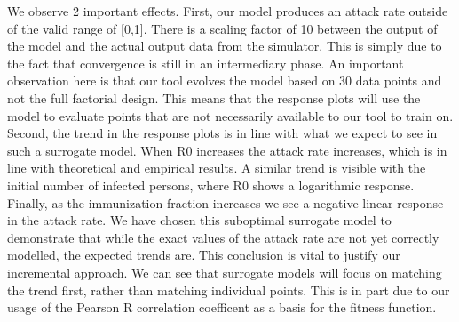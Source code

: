 We observe 2 important effects. First, our model produces an attack rate outside of the valid range of [0,1]. There is a scaling factor of 10 between the output of the model and the actual output data from the simulator. This is simply due to the fact that convergence is still in an intermediary phase. An important observation here is that our tool evolves the model based on 30 data points and not the full factorial design. This means that the response plots will use the model to evaluate points that are not necessarily available to our tool to train on. Second, the trend in the response plots is in line with what we expect to see in such a surrogate model. When R0 increases the attack rate increases, which is in line with theoretical and empirical results. A similar trend is visible with the initial number of infected persons, where R0 shows a logarithmic response. Finally, as the immunization fraction increases we see a negative linear response in the attack rate. We have chosen this suboptimal surrogate model to demonstrate that while the exact values of the attack rate are not yet correctly modelled, the expected trends are. This conclusion is vital to justify our incremental approach. We can see that surrogate models will focus on matching the trend first, rather than matching individual points. This is in part due to our usage of the Pearson R correlation coefficent as a basis for the fitness function. 
